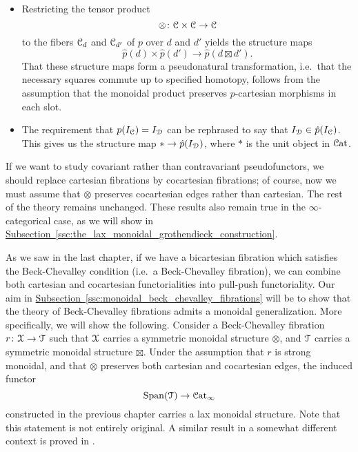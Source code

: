 \documentclass[main.tex]{subfiles}
\begin{document}
\begin{itemize}
  \item Restricting the tensor product
    \begin{equation*}
      \otimes\colon \mathcal{C} \times \mathcal{C} \to \mathcal{C}
    \end{equation*}
    to the fibers $\mathcal{C}_{d}$ and $\mathcal{C}_{d'}$ of $p$ over $d$ and $d'$ yields the structure maps
    \begin{equation*}
      \hat{p}(d) \times \hat{p}(d') \to \hat{p}(d \boxtimes d').
    \end{equation*}
    That these structure maps form a pseudonatural transformation, i.e.\ that the necessary squares commute up to specified homotopy, follows from the assumption that the monoidal product preserves $p$-cartesian morphisms in each slot.

  \item The requirement that $p(I_{\mathcal{C}}) = I_{\mathcal{D}}$ can be rephrased to say that $I_{\mathcal{D}} \in \hat{p}(I_{\mathcal{C}})$. This gives us the structure map $\ast \to \hat{p}(I_{\mathcal{D}})$, where $\ast$ is the unit object in $\mathcal{C}\mathrm{at}$.
\end{itemize}

If we want to study covariant rather than contravariant pseudofunctors, we should replace cartesian fibrations by cocartesian fibrations; of course, now we must assume that $\otimes$ preserves cocartesian edges rather than cartesian. The rest of the theory remains unchanged. These results also remain true in the $\infty$-categorical case, as we will show in \hyperref[ssc:the_lax_monoidal_grothendieck_construction]{Subsection~\ref*{ssc:the_lax_monoidal_grothendieck_construction}}.

As we saw in the last chapter, if we have a bicartesian fibration which satisfies the Beck-Chevalley condition (i.e.\ a Beck-Chevalley fibration), we can combine both cartesian and cocartesian functorialities into pull-push functoriality. Our aim in \hyperref[ssc:monoidal_beck_chevalley_fibrations]{Subsection~\ref*{ssc:monoidal_beck_chevalley_fibrations}} will be to show that the theory of Beck-Chevalley fibrations admits a monoidal generalization. More specifically, we will show the following. Consider a Beck-Chevalley fibration $r\colon \mathcal{X} \to \mathcal{T}$ such that $\mathcal{X}$ carries a symmetric monoidal structure $\otimes$, and $\mathcal{T}$ carries a symmetric monoidal structure $\boxtimes$. Under the assumption that $r$ is strong monoidal, and that $\otimes$ preserves both cartesian and cocartesian edges, the induced functor
\begin{equation*}
  \mathrm{Span}(\mathcal{T}) \to \mathcal{C}\mathrm{at}_{\infty}
\end{equation*}
constructed in the previous chapter carries a lax monoidal structure. Note that this statement is not entirely original. A similar result in a somewhat different context is proved in \cite{spectralmackeyfunctors2}.
\end{document}
